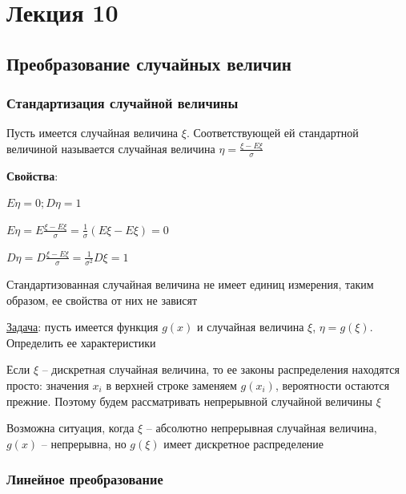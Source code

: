 \documentclass[12pt]{article}
\begin{document}
    \section{Лекция 10}

    \hypertarget{randomvaluetransformation}{}

    \subsection{Преобразование случайных величин}

    \hypertarget{standardizationofrandomvalue}{}

    \subsubsection{Стандартизация случайной величины}

    \Def Пусть имеется случайная величина $\xi$. Соответствующей ей стандартной величиной называется
    случайная величина $\eta = \frac{\xi - E\xi}{\sigma}$

    \textbf{Свойства}:

    $E\eta = 0; D\eta = 1$

    \begin{MyProof}
        $E\eta = E \frac{\xi - E\xi}{\sigma} = \frac{1}{\sigma} (E\xi - E\xi) = 0$

        $D\eta = D \frac{\xi - E\xi}{\sigma} = \frac{1}{\sigma^2} D\xi = 1$
    \end{MyProof}

    Стандартизованная случайная величина не имеет единиц измерения, таким образом, ее свойства от них не зависят

    \mediumvspace

    \underline{Задача}: пусть имеется функция $g(x)$ и случайная величина $\xi$, $\eta = g(\xi)$. Определить ее характеристики

    \Nota Если $\xi$ -- дискретная случайная величина, то ее законы распределения находятся просто: значения $x_i$ в верхней строке заменяем $g(x_i)$, вероятности остаются прежние.
    Поэтому будем рассматривать непрерывной случайной величины $\xi$

    \Notas Возможна ситуация, когда $\xi$ -- абсолютно непрерывная случайная величина, $g(x)$ -- непрерывна, но $g(\xi)$ имеет дискретное распределение

    \subsubsection{Линейное преобразование}
\end{document}
